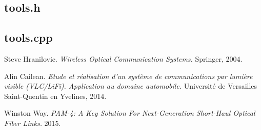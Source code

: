 \documentclass[12pt]{report}
\begin{document}


\subsection{tools.h}



\subsection{tools.cpp}





\begin{thebibliography}{9}

Steve Hranilovic.
\textit{Wireless Optical Communication Systems.}
Springer, 2004.

Alin Cailean.
\textit{Etude et réalisation d’un système de communications par lumière visible (VLC/LiFi). Application au domaine automobile.}
Université de Versailles Saint-Quentin en Yvelines, 2014.

Winston Way.
\textit{PAM-4: A Key Solution For Next-Generation Short-Haul Optical Fiber Links.}
2015.

\end{thebibliography}
\end{document}
